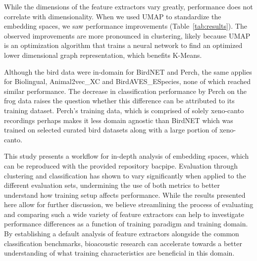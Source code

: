 While the dimensions of the feature extractors vary greatly, performance does not correlate with dimensionality.
When we used UMAP to standardize the embedding spaces, we saw performance improvements (Table~\ref{tab:results}).
The observed improvements are more pronounced in clustering, likely because UMAP is an optimization algorithm that trains a neural network to find an optimized lower dimensional graph representation,  which benefits K-Means.



Although the bird data were in-domain for BirdNET and Perch, the same applies for Biolingual, Animal2vec\_XC and BirdAVES\_ESpecies, none of which reached similar performance.
The decrease in classification performance by Perch on the frog data raises the question whether this difference can be attributed to its training dataset.
Perch's training data, which is comprised of solely xeno-canto recordings perhaps makes it less domain agnostic than BirdNET which was trained on selected curated bird datasets along with a large portion of xeno-canto.


This study presents a workflow for in-depth analysis of embedding spaces, which can be reproduced with the provided repository bacpipe.
Evaluation through clustering and classification has shown to vary significantly when applied to the different evaluation sets, undermining the use of both metrics to better understand how training setup affects performance.
While the results presented here allow for further discussion, we believe streamlining the process of evaluating and comparing such a wide variety of feature extractors can help to investigate performance differences as a function of training paradigm and training domain.
By establishing a default analysis of feature extractors alongside the common classification benchmarks, bioacoustic research can accelerate towards a better understanding of what training characteristics are beneficial in this domain.